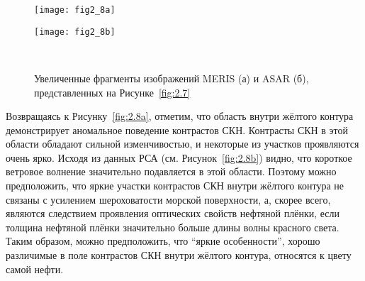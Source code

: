 \begin{figure}[!ht]
   	\centering
	\begin{minipage}{.49\textwidth}
	    \subcaptionbox{\label{fig:2.8a}}
		{\texttt{[image: fig2\_8a]}}
	\end{minipage}
	\hfill
	\begin{minipage}{.49\textwidth}
	    \subcaptionbox{\label{fig:2.8b}}
		{\texttt{[image: fig2\_8b]}}
	\end{minipage}
    \\
    \caption{Увеличенные фрагменты изображений MERIS (а) и ASAR (б), представленных на Рисунке~\ref{fig:2.7}}
    \label{fig:2.8}
\end{figure}


Возвращаясь к Рисунку~\ref{fig:2.8a}, отметим, что область внутри жёлтого контура демонстрирует аномальное поведение контрастов СКН. Контрасты СКН в этой области обладают сильной изменчивостью, и некоторые из участков проявляются очень ярко. Исходя из данных РСА (см. Рисунок~\ref{fig:2.8b}) видно, что короткое ветровое волнение значительно подавляется в этой области. Поэтому можно предположить, что яркие участки контрастов СКН внутри жёлтого контура не связаны с усилением шероховатости морской поверхности, а, скорее всего, являются следствием проявления оптических свойств нефтяной плёнки, если толщина нефтяной плёнки значительно больше длины волны красного света. Таким образом, можно предположить, что ``яркие особенности'', хорошо различимые в поле контрастов СКН внутри жёлтого контура, относятся к цвету самой нефти.



